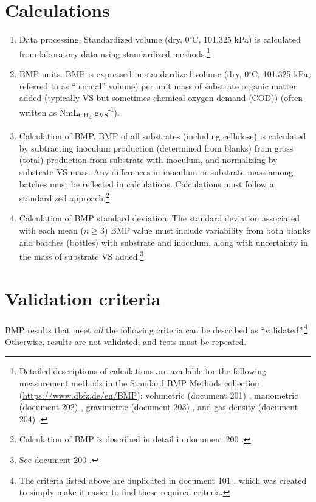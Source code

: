\documentclass[]{article}
\begin{document}
\section{Calculations}
\label{sec:calculations}
\begin{enumerate}
  \item Data processing.
    Standardized  volume (dry, 0$^\circ$C, 101.325 kPa) is calculated from laboratory data using standardized methods.\footnote{
      Detailed descriptions of calculations are available for the following measurement methods in the Standard BMP Methods collection (\url{https://www.dbfz.de/en/BMP}): volumetric (document 201) \citep{BMPdoc201vol}, manometric (document 202) \citep{BMPdoc202man}, gravimetric (document 203) \citep{BMPdoc203grav}, and gas density (document 204) \citep{BMPdoc204gasdens}.
    }
  \item BMP units.
	  BMP is expressed in standardized  volume (dry, 0$^\circ$C, 101.325 kPa, referred to as ``normal'' volume) per unit mass of substrate organic matter added (typically VS but sometimes chemical oxygen demand (COD)) (often written as NmL\textsubscript{CH\textsubscript{4}} g\textsubscript{VS}\textsuperscript{-1}). 
  \item Calculation of BMP.
    BMP of all substrates (including cellulose) is calculated by subtracting inoculum  production (determined from blanks) from gross (total)  production from substrate with inoculum, and normalizing by substrate VS mass.
    Any differences in inoculum or substrate mass among batches must be reflected in calculations.
    Calculations must follow a standardized approach.\footnote{
      Calculation of BMP is described in detail in document 200 \citep{BMPdoc200BMP}.
    }
  \item Calculation of BMP standard deviation.
    The standard deviation associated with each mean ($n \ge 3$) BMP value must include variability from both blanks and batches (bottles) with substrate and inoculum, along with uncertainty in the mass of substrate VS added.\footnote{
      See document 200 \citep{BMPdoc200BMP}. 
    }
\end{enumerate}

\section{Validation criteria}
\label{sec:crit}
BMP results that meet \textit{all} the following criteria can be described as ``validated''.\footnote{
The criteria listed above are duplicated in document 101 \citep{BMPdoc101val}, which was created to simply make it easier to find these required criteria.
}
Otherwise, results are not validated, and tests must be repeated.
\end{document}
